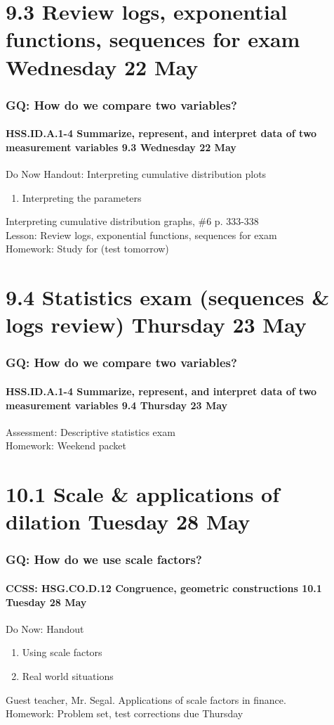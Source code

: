 \documentclass{beamer}
\begin{document}
\section{9.3 Review logs, exponential functions, sequences for exam Wednesday 22 May}
  \frame
  {
    \frametitle{GQ: How do we compare two variables?}
    \framesubtitle{HSS.ID.A.1-4 Summarize, represent, and interpret data of two measurement variables \hfill \alert{9.3 Wednesday 22 May}}

    \begin{block}{Do Now Handout: Interpreting cumulative distribution plots}
        \begin{enumerate}
          \item Interpreting the parameters
      \end{enumerate}
    \end{block}
    Interpreting cumulative distribution graphs, \#6 p. 333-338\\
    Lesson: Review logs, exponential functions, sequences for exam\\[0.5cm]
    Homework: Study for (\alert{test tomorrow})
  }

\section{9.4 Statistics exam (sequences \& logs review) Thursday 23 May}
  \frame
  {
    \frametitle{GQ: How do we compare two variables?}
    \framesubtitle{HSS.ID.A.1-4 Summarize, represent, and interpret data of two measurement variables \hfill \alert{9.4 Thursday 23 May}}

    Assessment: Descriptive statistics exam\\[0.5cm]
    Homework: Weekend packet
  }

  \section{10.1 Scale \& applications of dilation Tuesday 28 May}
    \frame
    {
      \frametitle{GQ: How do we use scale factors?}
      \framesubtitle{CCSS: HSG.CO.D.12 Congruence, geometric constructions \hfill \alert{10.1 Tuesday 28 May}}

      \begin{block}{Do Now: Handout}
        \begin{enumerate}
          \item Using scale factors
          \item Real world situations
        \end{enumerate}
      \end{block}
      Guest teacher, Mr. Segal. Applications of scale factors in finance.\\[0.25cm]
      Homework: Problem set, test corrections due Thursday
    }
\end{document}
